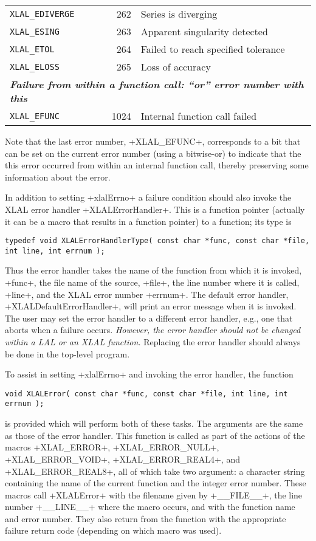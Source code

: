 \documentclass[10pt]{ligodcc}
\makeatletter
\def\verb{\relax\ifmmode\hbox\else\leavevmode\null\fi
  \bgroup
    \color{blue}\small
    \verb@eol@error \let\do\@makeother \dospecials
    \verbatim@font\@noligs
    \@ifstar\@sverb\@verb}
\makeatother
\begin{document}
\begin{center}
\begin{tabular}{|lrl|}
\tt XLAL\_EDIVERGE   &   262 & Series is diverging \\
\tt XLAL\_ESING      &   263 & Apparent singularity detected \\
\tt XLAL\_ETOL       &   264 & Failed to reach specified tolerance \\
\tt XLAL\_ELOSS      &   265 & Loss of accuracy \\
\multicolumn{3}{|l|}{\bfseries\itshape Failure from within a function call: ``or'' error number with this} \\
\tt XLAL\_EFUNC      &  1024 & Internal function call failed \\
\hline
\end{tabular}
\end{center}
Note that the last error number, \verb+XLAL_EFUNC+, corresponds to a bit that
can be set on the current error number (using a bitwise-or) to indicate that
the this error occurred from within an internal function call, thereby
preserving some information about the error.

In addition to setting \verb+xlalErrno+ a failure condition should also invoke
the XLAL error handler \verb+XLALErrorHandler+.  This is a function pointer
(actually it can be a macro that results in a function pointer) to a function;
its type is
\begin{verbatim}
typedef void XLALErrorHandlerType( const char *func, const char *file, int line, int errnum );
\end{verbatim}
Thus the error handler takes the name of the function from which it is
invoked, \verb+func+, the file name of the source, \verb+file+, the
line number where it is called, \verb+line+, and the XLAL error number
\verb+errnum+.  The default error handler, \verb+XLALDefaultErrorHandler+,
will print an error message when it is invoked.  The user may set the error
handler to a different error handler, e.g., one that aborts when a failure
occurs.  \emph{However, the error handler should not be changed within a
LAL or an XLAL function.}  Replacing the error handler should always be
done in the top-level program.

To assist in setting \verb+xlalErrno+ and invoking the error handler, 
the function
\begin{verbatim}
void XLALError( const char *func, const char *file, int line, int errnum );
\end{verbatim}
is provided which will perform both of these tasks.  The arguments are the same
as those of the error handler.  This function is called as part of the
actions of the macros \verb+XLAL_ERROR+, \verb+XLAL_ERROR_NULL+,
\verb+XLAL_ERROR_VOID+, \verb+XLAL_ERROR_REAL4+, and \verb+XLAL_ERROR_REAL8+,
all of which take two argument: a character string containing the name of
the current function and the integer error number.  These macros call
\verb+XLALError+ with the filename given by \verb+__FILE__+, the line number
\verb+__LINE__+ where the macro occurs, and with the function name and error
number.  They also return from the function with the appropriate failure
return code (depending on which macro was used).
\end{document}
